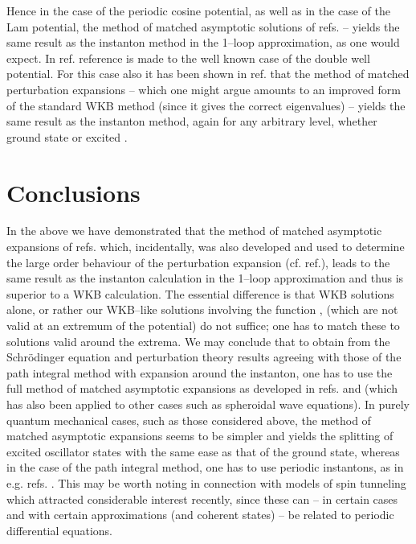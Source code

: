 \documentclass[a4paper,12pt,a4]{article}
\begin{document}
Hence in the case of the periodic cosine potential,
as well as in the case of the Lam\coordHE{} potential,
the method of matched asymptotic solutions  of refs.\cite{7,9} --
yields the same result as the instanton
method in the 1--loop
approximation, as one would expect.  In ref.\cite{1}
reference is made to the well known
case of the double well potential. 
For this case also it has been shown in ref. \cite{10}  that the method
of matched perturbation expansions  -- which one might argue
amounts to an improved form of the standard WKB method
(since it gives the correct eigenvalues) -- yields the
same result as the instanton method, again for any
arbitrary level, whether ground state or excited \cite{10}.  




\section{Conclusions}
In the above we have demonstrated that
 the method of matched
asymptotic expansions of refs. \cite{7,9,10}
which, incidentally, was also developed and used to
determine the large order behaviour of the
perturbation expansion (cf. ref.\cite{13}),
 leads to the same result as the instanton
calculation in the 1--loop
approximation and thus is superior to a WKB
calculation.  The essential difference is
that WKB solutions alone,
or rather our WKB--like solutions involving the
function \coordHE{}, (which are not valid
at an extremum of the potential) do not suffice;
one has to match these to
solutions valid around the extrema.  
We may conclude that to obtain from the
Schr\"odinger equation and perturbation theory
 results agreeing with those of
the path integral method with expansion around the
instanton, one has to use the full 
method of matched asymptotic expansions
as developed in refs.\cite{9} and \cite{7,10}
(which has also been applied to other cases
such as spheroidal wave equations\cite{14}).
In purely quantum mechanical cases, such as those considered
above, the method of matched asymptotic 
expansions seems to be simpler and yields the
splitting of excited oscillator states with the same ease as 
that of the ground state, whereas in the case of the
path integral method, one has to use periodic instantons, as
 in e.g. refs. \cite{12,15}.
This may be worth noting in connection with
models of spin tunneling which attracted considerable interest
recently, since these can -- in certain cases and with
certain approximations (and coherent states)
-- be related to periodic differential equations.
\end{document}

